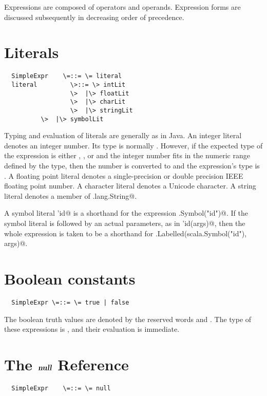 \documentclass[11pt]{report}
\begin{document}
Expressions are composed of operators and operands. Expression forms are
discussed subsequently in decreasing order of precedence. 

\section{Literals}

\syntax\begin{verbatim}
  SimpleExpr    \=::= \= literal
  literal         \>::= \> intLit
                  \>  |\> floatLit
                  \>  |\> charLit
                  \>  |\> stringLit
		  \>  |\> symbolLit
\end{verbatim}

Typing and evaluation of literals are generally as in Java.
An integer literal denotes an integer number. Its type is normally
\verb@int@. However, if the expected type \verb@pt@ of the expression
is either \verb@byte@, \verb@short@, or \verb@char@ and the integer
number fits in the numeric range defined by the type, then the number
is converted to \verb@pt@ and the expression's type is \verb@pt@.  A
floating point literal denotes a single-precision or double precision
IEEE floating point number. A character literal denotes a Unicode
character. A string literal denotes a member of
\verb@java.lang.String@. 

A symbol literal \verb@'id@ is a shorthand for the expression
\verb@scala.Symbol("id")@. If the symbol literal is followed by an
actual parameters, as in \verb@'id(args)@, then the whole expression
is taken to be a shorthand for
\verb@scala.Labelled(scala.Symbol("id"), args)@.

\section{Boolean constants}

\begin{verbatim}
  SimpleExpr \=::= \= true | false
\end{verbatim}

The boolean truth values are denoted by the reserved words \verb@true@
and \verb@false@. The type of these expressions is \verb@boolean@, and
their evaluation is immediate.

\section{The $\mbox{\sl\bfseries null}$ Reference}

\syntax\begin{verbatim}
  SimpleExpr    \=::= \= null
\end{verbatim}
\end{document}
